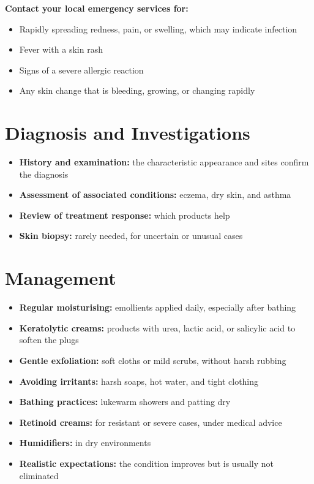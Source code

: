 \textbf{Contact your local emergency services for:}
\begin{itemize}
    \item Rapidly spreading redness, pain, or swelling, which may indicate infection
    \item Fever with a skin rash
    \item Signs of a severe allergic reaction
    \item Any skin change that is bleeding, growing, or changing rapidly
\end{itemize}

\section*{Diagnosis and Investigations}
\begin{itemize}
    \item \textbf{History and examination:} the characteristic appearance and sites confirm the diagnosis
    \item \textbf{Assessment of associated conditions:} eczema, dry skin, and asthma
    \item \textbf{Review of treatment response:} which products help
    \item \textbf{Skin biopsy:} rarely needed, for uncertain or unusual cases
\end{itemize}

\section*{Management}
\begin{itemize}
    \item \textbf{Regular moisturising:} emollients applied daily, especially after bathing
    \item \textbf{Keratolytic creams:} products with urea, lactic acid, or salicylic acid to soften the plugs
    \item \textbf{Gentle exfoliation:} soft cloths or mild scrubs, without harsh rubbing
    \item \textbf{Avoiding irritants:} harsh soaps, hot water, and tight clothing
    \item \textbf{Bathing practices:} lukewarm showers and patting dry
    \item \textbf{Retinoid creams:} for resistant or severe cases, under medical advice
    \item \textbf{Humidifiers:} in dry environments
    \item \textbf{Realistic expectations:} the condition improves but is usually not eliminated
\end{itemize}

